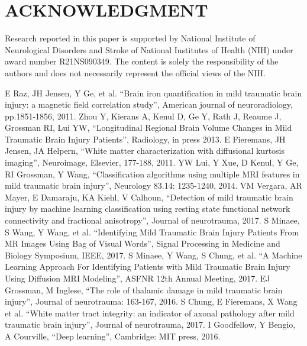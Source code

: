 \documentclass[letterpaper, 10 pt, conference]{ieeeconf}  %
\begin{document}





\section*{ACKNOWLEDGMENT}
Research reported in this paper is supported by National Institute of Neurological Disorders and Stroke of  National Institutes of Health (NIH) under award number  R21NS090349. The content is solely the responsibility of the authors and does not necessarily represent the official views of the NIH.




\begin{thebibliography}{99}
\footnotesize
{}
E Raz, JH Jensen, Y Ge,  et al. ``Brain iron quantification in mild traumatic brain injury: a magnetic field correlation study'', American journal of neuroradiology, pp.1851-1856, 2011.
Zhou Y, Kierans A, Kenul D, Ge Y, Rath J, Reaume J, Grossman RI, Lui YW, ``Longitudinal Regional Brain Volume Changes in Mild Traumatic Brain Injury Patients'', Radiology, in press 2013.
E Fieremans, JH Jensen, JA Helpern, ``White matter characterization with diffusional kurtosis imaging'', Neuroimage, Elsevier, 177-188, 2011.
YW Lui, Y Xue, D Kenul, Y Ge, RI Grossman, Y Wang, ``Classification algorithms using multiple MRI features in mild traumatic brain injury'', Neurology 83.14: 1235-1240, 2014.
VM Vergara, AR Mayer, E Damaraju, KA Kiehl, V Calhoun, ``Detection of mild traumatic brain injury by machine learning classification using resting state functional network connectivity and fractional anisotropy'', Journal of neurotrauma, 2017.
S Minaee, S Wang, Y Wang,  et al. ``Identifying Mild Traumatic Brain Injury Patients From MR Images Using Bag of Visual Words'', Signal Processing in Medicine and Biology Symposium, IEEE, 2017.
S Minaee, Y Wang, S Chung,  et al. ``A Machine Learning Approach For Identifying Patients with Mild Traumatic Brain Injury Using Diffusion MRI Modeling'', ASFNR 12th Annual Meeting, 2017.
EJ Grossman, M Inglese, ``The role of thalamic damage in mild traumatic brain injury'', Journal of neurotrauma: 163-167, 2016.
S Chung, E Fieremans, X Wang et al. ``White matter tract integrity: an indicator of axonal pathology after mild traumatic brain injury'', Journal of neurotrauma, 2017.
I Goodfellow, Y Bengio, A Courville, ``Deep learning'',  Cambridge: MIT press, 2016.


\end{thebibliography}
\end{document}
